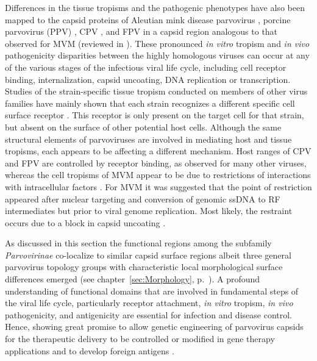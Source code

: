 Differences in the tissue tropisms and the pathogenic phenotypes  have also been mapped to the capsid proteins of Aleutian mink disease parvovirus \cite{pmid8396664}, porcine parvovirus (PPV)  \cite{pmid8642680}, CPV \cite{pmid3176341, pmid1331498}, and FPV \cite{pmid7513918} in a capsid region analogous to that observed for MVM (reviewed in \cite{tropism}). These pronounced \textit{in vitro} tropism and \textit{in vivo} pathogenicity disparities between the highly homologous viruses can occur at any of the various stages of the infectious viral life cycle, including cell receptor binding, internalization, capsid uncoating, DNA replication or transcription. Studies of the strain-specific tissue tropism conducted on members of other virus families have mainly shown that each strain recognizes a different specific cell surface receptor \cite{pmid6290894, pmid13908368, pmid6293181, pmid6278730, pmid7436739, pmid7365250, pmid271999}. This receptor is only present on the target cell for that strain, but absent on the surface of other potential host cells. Although the same structural elements of parvoviruses are involved in mediating host and tissue tropisms, each appears to be affecting a different mechanism. Host ranges of CPV and FPV are controlled by receptor binding, as observed for many other viruses, whereas the cell tropisms of MVM appear to be due to restrictions of interactions with intracellular factors \cite{pmid9817841, pmid12941411, pmid6602221}. For MVM it was suggested that the point of restriction appeared after nuclear targeting and conversion of genomic ssDNA to RF intermediates but prior to viral genome replication. Most likely, the restraint occurs due to a block in capsid uncoating \cite{pmid9311862, pmid1322591}.

As discussed in this section the functional regions among the subfamily \textit{Parvovirinae} co-localize to similar capsid surface regions albeit three general parvovirus topology groups with characteristic local morphological surface differences emerged (see chapter~\ref{sec:Morphology}, p.~\pageref{sec:Morphology}). A profound understanding of functional domains that are involved in fundamental steps of the viral life cycle, particularly receptor attachment, \textit{in vitro} tropism, \textit{in vivo} pathogenicity, and antigenicity are essential for infection and disease control. Hence, showing great promise to allow genetic engineering of parvovirus capsids for the therapeutic delivery to be controlled or modified in gene therapy applications and to develop foreign antigens \cite{pmid12941411, tropism}.     




